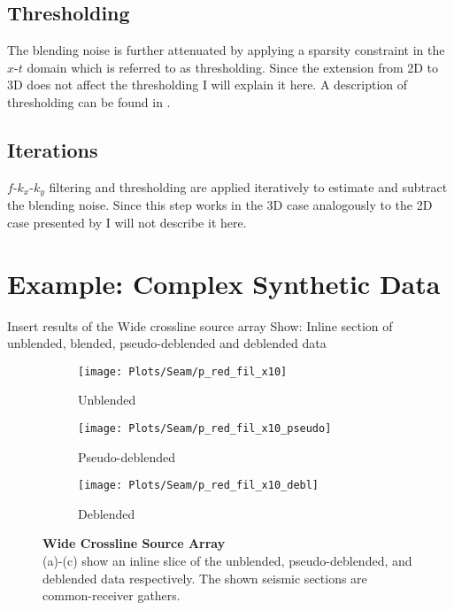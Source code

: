 \documentclass{madrid15WS}
\begin{document}
\subsection{Thresholding}

The blending noise is further attenuated by applying a sparsity constraint in the $x$-$t$ domain which is referred to as thresholding. Since the extension from 2D to 3D does not affect the thresholding I will explain it here. A description of thresholding can be found in \citet{Mahdad-Deblending-Method}.

\subsection{Iterations}

$f$-$k_x$-$k_y$ filtering and thresholding are applied iteratively to estimate and subtract the blending noise. Since this step works in the 3D case analogously to the 2D case presented by \citet{Mahdad-Deblending-Method} I will not describe it here.


\section{Example: Complex Synthetic Data}

Insert results of the Wide crossline source array
Show: Inline section of unblended, blended, pseudo-deblended and deblended data

\begin{figure}
	\centering
	\begin{subfigure}[t]{0.2\textwidth}
		\centering
		\texttt{[image: Plots/Seam/p\_red\_fil\_x10]}
		\caption{Unblended}
		\label{fig:Example-Unblendedx}
	\end{subfigure}
	\centering
	\begin{subfigure}[t]{0.2\textwidth}
		\centering
		\texttt{[image: Plots/Seam/p\_red\_fil\_x10\_pseudo]} %
		\caption{Pseudo-deblended}
		\label{fig:Example-Pseudox}
	\end{subfigure}
	\centering
	\begin{subfigure}[t]{0.2\textwidth}
		\centering
		\texttt{[image: Plots/Seam/p\_red\_fil\_x10\_debl]} %
		\caption{Deblended}
		\label{fig:Example-Deblendedx}
	\end{subfigure}
		
	\caption{\textbf{Wide Crossline Source Array}\\(a)-(c) show an inline slice of the unblended, pseudo-deblended, and deblended data respectively. The shown seismic sections are common-receiver gathers.}
	\label{fig:Example-Inline-Slices}

\end{figure}
\end{document}
